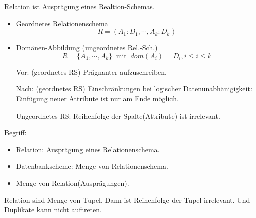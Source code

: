 \begin{definition}
    Relation ist Auspr\"agung eines Realtion-Schemas.
    \begin{itemize}
        \item Geordnetes Relationenschema\[R = (A_1:D_1,\cdots , A_k:D_k)\]
        \item Dom\"anen-Abbildung (ungeordnetes Rel.-Sch.) \[R = \{A_1,\cdots,A_k\}\  \text{ mit }\  dom (A_i) = D_i, i \leq i \leq k\]
    \end{itemize}
\end{definition}
\begin{remark}
    \begin{enumerate}
        \item[Vor:](geordnetes RS) Prägnanter aufzuschreiben.
        \item[Nach:](geordnetes RS) Einschr\"ankungen bei logischer Datenunabh\"anigigkeit: Einf\"ugung neuer Attribute ist nur am Ende m\"oglich.  
        \item[Ungeordnetes RS:] Reihenfolge der Spalte(Attribute) ist irrelevant. 
    \end{enumerate}
\end{remark}

\begin{remark}
    Begriff:
    \begin{itemize}
        \item Relation: Auspr\"agung eines Relationenschema.
        \item Datenbankscheme: Menge von Relationenschema.
        \item Menge von Relation(Auspr\"agungen).
    \end{itemize}
\end{remark}


\begin{remark}
    Relation sind Menge von Tupel. Dann ist Reihenfolge der Tupel irrelevant. Und Duplikate kann nicht auftreten.
\end{remark}

